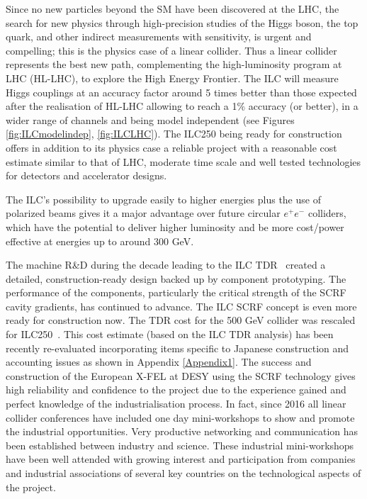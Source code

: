 \documentclass[%
 reprint,
 amsmath,amssymb,
 aps,
]{revtex4-1}
\newcommand{\todo}[1]{\textcolor{red}{{#1}}}
\def\ee{e^+e^-}
\begin{document}
Since no new particles beyond the SM have been discovered at the LHC, the search for new physics through high-precision studies of the Higgs boson, the top quark, and other indirect measurements with sensitivity, is urgent and compelling; this is the physics case of a linear collider. Thus a linear collider represents the best new path, complementing the high-luminosity program at LHC (HL-LHC), to explore the High Energy Frontier. The ILC will measure Higgs couplings at an accuracy factor around 5 times better than those expected after the realisation of HL-LHC allowing to reach a 1\% accuracy (or better), in a wider range of channels and being model independent (see Figures \ref{fig:ILCmodelindep}, \ref{fig:ILCLHC}). The ILC250  being ready for construction offers in addition to its physics case a reliable project with a reasonable cost estimate similar to that of LHC, moderate time scale and well tested technologies for detectors and accelerator designs. 

The ILC’s possibility to upgrade easily to higher energies plus the use of polarized beams gives it a major advantage over future circular $\ee$ colliders, which have the potential to deliver higher luminosity and be more cost/power effective at energies up to around 300 GeV.%



The machine R\&D during the decade leading to the ILC TDR~\cite{Behnke:2013xla} created a detailed, construction-ready design backed up by
component prototyping. The performance of the components, particularly the critical strength of the SCRF cavity gradients,
has continued to advance.  The ILC SCRF concept is even more ready for construction now.  The TDR cost for the 500 GeV collider was rescaled for ILC250~\cite{Evans:2017rvt}. This cost estimate (based on the ILC TDR analysis) has been recently re-evaluated incorporating items specific to Japanese construction and accounting issues as shown in Appendix \ref{Appendix1}. The success and construction of the European X-FEL at DESY using the SCRF technology gives high reliability and confidence to the project due to the experience gained and perfect knowledge of the industrialisation process. In fact, since 2016 all linear collider conferences have included one day mini-workshops to show and promote the industrial opportunities. Very productive networking and communication has been established between industry and science. These industrial mini-workshops have been well attended with growing  interest and participation from companies and industrial associations of several key countries on the technological aspects of the project.  
\end{document}
